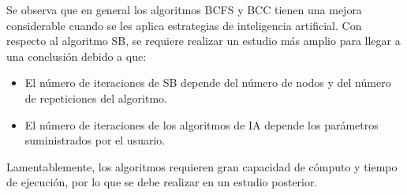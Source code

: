Se observa que en general los algoritmos BCFS y BCC tienen una mejora considerable cuando se les aplica estrategias de inteligencia artificial. Con respecto al algoritmo SB, se requiere realizar un estudio más amplio para llegar a una conclusión debido a que:

\begin{itemize}
    \item El número de iteraciones de SB depende del número de nodos y del número de repeticiones del algoritmo.
    \item El número de iteraciones de los algoritmos de IA depende los parámetros suministrados por el usuario.
\end{itemize}

Lamentablemente, los algoritmos requieren gran capacidad de cómputo y tiempo de ejecución, por lo que se debe realizar en un estudio posterior.
